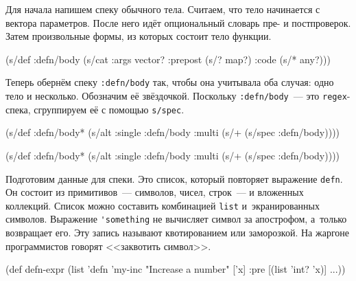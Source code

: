 Для начала напишем спеку обычного тела. Считаем, что тело начинается с вектора
параметров. После него идёт опциональный словарь пре- и постпроверок. Затем
произвольные формы, из которых состоит тело функции.

\begin{english}
  \begin{clojure}
(s/def :defn/body
  (s/cat :args vector?
         :prepost (s/? map?)
         :code (s/* any?)))
  \end{clojure}
\end{english}

Теперь обернём спеку \verb|:defn/body| так, чтобы она учитывала оба
случая: одно тело и несколько. Обозначим её звёздочкой. Поскольку
\verb|:defn/body|~--- это \verb|regex|-спека, сгруппируем её с помощью
\verb|s/spec|.

\ifx\DEVICETYPE\MOBILE

\begin{english}
  \begin{clojure}
(s/def :defn/body*
  (s/alt :single :defn/body
         :multi (s/+
                  (s/spec :defn/body))))
  \end{clojure}
\end{english}

\else

\begin{english}
  \begin{clojure}
(s/def :defn/body*
  (s/alt :single :defn/body
         :multi (s/+ (s/spec :defn/body))))
  \end{clojure}
\end{english}

\fi


Подготовим данные для спеки. Это список, который повторяет выражение
\verb|defn|. Он состоит из примитивов~--- символов, чисел, строк~--- и вложенных
коллекций. Список можно составить комбинацией \verb|list| и~экранированных
символов. Выражение \verb|'something| не вычисляет символ за апострофом,
а~только возвращает его. Эту запись называют квотированием  или
заморозкой. На жаргоне программистов говорят <<заквотить символ>>.

\begin{english}
  \begin{clojure}
(def defn-expr
  (list 'defn 'my-inc
        "Increase a number"
        ['x]
        {:pre [(list 'int? 'x)]} ...))
  \end{clojure}
\end{english}

